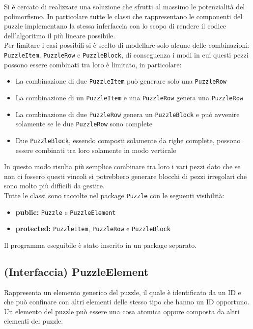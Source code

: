 \documentclass[a4paper, 11pt]{article}
\begin{document}
Si è cercato di realizzare una soluzione che sfrutti al massimo le potenzialità del polimorfismo. In particolare tutte le classi che rappresentano le componenti del puzzle implementano la stessa inferfaccia con lo scopo di rendere il codice dell'algoritmo il più lineare possibile.
\\
Per limitare i casi possibili si è scelto di modellare solo alcune delle combinazioni: \texttt{PuzzleItem}, \texttt{PuzzleRow} e \texttt{PuzzleBlock}, di conseguenza i modi in cui questi pezzi possono essere combinati tra loro è limitato, in particolare:
\begin{itemize}
\item La combinazione di due \texttt{PuzzleItem} può generare solo una \texttt{PuzzleRow}
\item La combinazione di un \texttt{PuzzleItem} e una \texttt{PuzzleRow} genera una \texttt{PuzzleRow}
\item La combinazione di due \texttt{PuzzleRow} genera un \texttt{PuzzleBlock} e può avvenire solamente se le due \texttt{PuzzleRow} sono complete
\item Due \texttt{PuzzleBlock}, essendo composti solamente da righe complete, possono essere combinati tra loro solamente in modo verticale
\end{itemize}
In questo modo risulta più semplice combinare tra loro i vari pezzi dato che se non ci fossero questi vincoli si potrebbero generare blocchi di pezzi irregolari che sono molto più difficili da gestire.
\\
Tutte le classi sono raccolte nel package \texttt{Puzzle} con le seguenti visibilità:
\begin{itemize}
\item \textbf{public:} \texttt{Puzzle} e \texttt{PuzzleElement}
\item \textbf{protected:} \texttt{PuzzleItem}, \texttt{PuzzleRow} e \texttt{PuzzleBlock}
\end{itemize}
Il programma eseguibile è stato inserito in un package separato.


\subsection{(Interfaccia) PuzzleElement}

Rappresenta un elemento generico del puzzle, il quale è identificato da un ID e che può confinare con altri elementi delle stesso tipo che hanno un ID opportuno.
Un elemento del puzzle può essere una cosa atomica oppure composta da altri elementi del puzzle.
\end{document}
